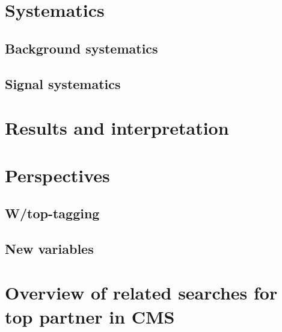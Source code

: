 
    \section{Systematics \label{sec:analysis_systematics}}
        \loremipsum

        \subsection{Background systematics \label{sec:background_systematics}}
        \loremipsum

        \subsection{Signal systematics}
        \loremipsum

    \section{Results and interpretation \label{sec:analysis_results}}
        \loremipsum

    \section{Perspectives \label{sec:analysis_perspective}}
        \loremipsum
        \subsection{W/top-tagging}
        \loremipsum
        \subsection{New variables}
        \loremipsum
    
    \section{Overview of related searches for top partner in CMS \label{sec:analysis_overviewStopSearches}}
        \loremipsum

















